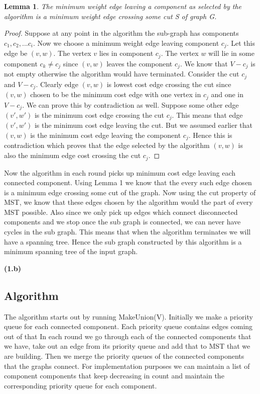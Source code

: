 \documentclass[12pt]{article}
\newtheorem{lemma}[theorem]{Lemma}
\begin{document}
\begin{lemma} 
The minimum weight edge leaving a component as selected by the algorithm is a minimum weight edge crossing some cut S of graph G.
\end{lemma}
\begin{proof}
Suppose at any point in the algorithm the sub-graph has components $c_1, c_2, ... c_i$. Now we choose a minimum weight edge leaving component $c_j$. Let this edge be $(v,w)$. The vertex $v$ lies in component $c_j$. The vertex $w$ will lie in some component $c_k \neq c_j$ since $(v,w)$ leaves the component $c_j$. We know that $V-c_j$ is not empty otherwise the algorithm would have terminated. Consider the cut $c_j$ and $V- c_j$. Clearly edge $(v,w)$ is lowest cost edge crossing the cut since $(v,w)$ chosen to be the minimum cost edge with one vertex in $c_j$ and one in $V-c_j$. We can prove this by contradiction as well. Suppose some other edge $(v',w')$ is the minimum cost edge crossing the cut $c_j$. This means that edge $(v',w')$ is the minimum cost edge leaving the cut. But we assumed earlier that $(v,w)$ is the minimum cost edge leaving the component $c_j$. Hence this is contradiction which proves that the edge selected by the algorithm $(v,w)$ is also the minimum edge cost crossing the cut $c_j$.
\end{proof}
Now the algorithm in each round picks up minimum cost edge leaving each connected component. Using Lemma 1 we know that the every such edge chosen is a minimum edge crossing some cut of the graph. Now using the cut property of MST, we know that these edges chosen by the algorithm would the part of every MST possible. Also since we only pick up edges which connect disconnected components and we stop once the sub graph is connected, we can never have cycles in the sub graph. This means that when the algorithm terminates we will have a spanning tree. Hence the sub graph constructed by this algorithm is a minimum spanning tree of the input graph.

\textbf{(1.b)}

\subsection{Algorithm}

The algorithm starts out by running MakeUnion(V). Initially we make a priority queue for each connected component. Each priority queue contains edges coming out of that In each round we go through each of the connected components that we have, take out an edge from its priority queue and add that to MST that we are building. Then we merge the priority queues of the connected components that the graphs connect. For implementation purposes we can maintain a list of component components that keep decreasing in count and maintain the corresponding priority queue for each component.
\end{document}
